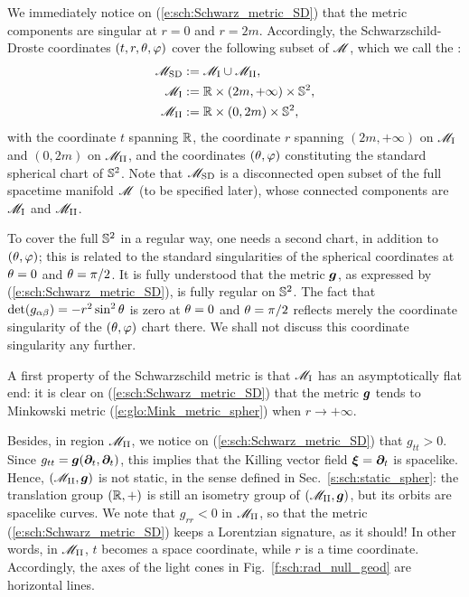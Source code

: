 We immediately notice on (\ref{e:sch:Schwarz_metric_SD}) that the metric
components are singular at $r=0$ and $r=2m$. Accordingly, the Schwarzschild-Droste coordinates $(t,r,\theta,\varphi)$ cover the following subset of $\mathscr{M}$, which we call the
:
\begin{subequations}
\begin{align}
    \mathscr{M}_{\rm SD} & :=  \mathscr{M}_{\rm I} \cup \mathscr{M}_{\rm II} , \\
    \mathscr{M}_{\rm I} & :=  \mathbb{R}\times(2m,+\infty)\times\mathbb{S}^2 ,\\
    \mathscr{M}_{\rm II} & :=  \mathbb{R}\times(0,2m)\times\mathbb{S}^2 ,
\end{align}
\end{subequations}
with the coordinate $t$ spanning $\mathbb{R}$, the coordinate $r$ spanning $(2m,+\infty)$
on $\mathscr{M}_{\rm I}$ and $(0,2m)$ on $\mathscr{M}_{\rm II}$, and the coordinates $(\theta,\varphi)$
constituting the standard spherical chart of $\mathbb{S}^2$.
Note that $\mathscr{M}_{\rm SD}$ is a disconnected open subset of the full spacetime
manifold $\mathscr{M}$ (to be specified later), whose connected components are
$\mathscr{M}_{\rm I}$ and $\mathscr{M}_{\rm II}$.

\begin{remark}
To cover the full $\mathbb{S}^2$ in a regular way, one needs a second chart, in
addition to $(\theta,\varphi)$; this is related to the standard singularities of
the spherical coordinates at $\theta=0$ and $\theta=\pi/2$. It is fully understood
that the metric $\bm{g}$, as expressed by (\ref{e:sch:Schwarz_metric_SD}), is
fully regular on $\mathbb{S}^2$. The fact that $\det(g_{\alpha\beta}) = -r^2\sin^2\theta$ is zero
at $\theta=0$ and $\theta=\pi/2$ reflects merely the coordinate singularity
of the $(\theta,\varphi)$ chart there. We shall not discuss this coordinate singularity
any further.
\end{remark}

A first property of the Schwarzschild metric is that $\mathscr{M}_{\rm I}$ has an
asymptotically flat end: it is clear on (\ref{e:sch:Schwarz_metric_SD})
that the metric $\bm{g}$ tends to Minkowski metric (\ref{e:glo:Mink_metric_spher})
when $r\rightarrow +\infty$.

Besides, in region $\mathscr{M}_{\rm II}$, we notice on (\ref{e:sch:Schwarz_metric_SD})
that $g_{tt} > 0$. Since $g_{tt} = \bm{g}(\bm{\partial}_t,\bm{\partial}_t)$, this implies
that the Killing vector field $\bm{\xi} = \bm{\partial}_t$ is spacelike. Hence,
$(\mathscr{M}_{\rm II},\bm{g})$ is not static, in the sense defined in
Sec.~\ref{s:sch:static_spher}: the translation group $(\mathbb{R},+)$ is still an
isometry group of $(\mathscr{M}_{\rm II},\bm{g})$, but its orbits are spacelike curves.
We note that $g_{rr} < 0$ in $\mathscr{M}_{\rm II}$, so that the
metric (\ref{e:sch:Schwarz_metric_SD}) keeps a Lorentzian signature,
as it should!
In other words, in $\mathscr{M}_{\rm II}$, $t$ becomes a space coordinate, while
$r$ is a time coordinate. Accordingly, the axes of the light cones
in Fig.~\ref{f:sch:rad_null_geod} are horizontal lines.

